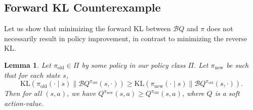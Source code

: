 \documentclass{article}
\newcommand{\KL}{\mathrm{KL}}
\newcommand{\boltzmannQ}{\mathcal{B}Q}
\newcommand{\piold}{{\pi_\mathrm{old}}}
\newcommand{\pinew}{{\pi_\mathrm{new}}}
\newtheorem{lemma}{Lemma}
\begin{document}
\subsection{Forward KL Counterexample}
Let us show that minimizing the forward KL between $\boltzmannQ$ and $\pi$ does not necessarily result in policy improvement, in contrast to minimizing the reverse KL. 

\begin{lemma}\label{lem:stronger-sac}
Let $\piold \in \Pi$ by some policy in our policy class $\Pi$. Let $\pinew$ be such that for each state $s$,
\begin{equation}
    \KL(\piold(\cdot \mid s) \parallel \boltzmannQ^\piold(s, \cdot)) \geq \KL(\pinew(\cdot \mid s) \parallel \boltzmannQ^\piold(s, \cdot)).
\end{equation}
Then for all $(s, a)$, we have $Q^\pinew(s, a) \geq Q^\piold(s, a)$, where $Q$ is a soft action-value.
\end{lemma}
\end{document}
